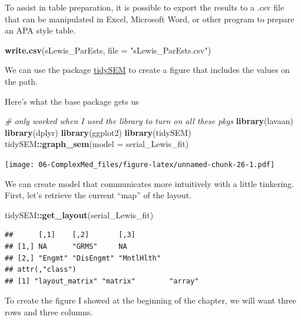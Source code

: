 \documentclass[
  11pt,
]{book}
\newenvironment{Shaded}{\begin{snugshade}}{\end{snugshade}}
\newcommand{\AttributeTok}[1]{\textcolor[rgb]{0.27,0.27,0.27}{#1}}
\newcommand{\CommentTok}[1]{\textcolor[rgb]{0.37,0.37,0.37}{\textit{#1}}}
\newcommand{\FunctionTok}[1]{\textcolor[rgb]{0.27,0.27,0.27}{\textbf{#1}}}
\newcommand{\NormalTok}[1]{#1}
\newcommand{\SpecialCharTok}[1]{\textcolor[rgb]{0.43,0.43,0.43}{\textbf{#1}}}
\newcommand{\StringTok}[1]{\textcolor[rgb]{0.5,0.5,0.5}{#1}}
\begin{document}
To assist in table preparation, it is possible to export the results to a .csv file that can be manipulated in Excel, Microsoft Word, or other program to prepare an APA style table.

\begin{Shaded}
\begin{Highlighting}[]
\FunctionTok{write.csv}\NormalTok{(sLewis\_ParEsts, }\AttributeTok{file =} \StringTok{"sLewis\_ParEsts.csv"}\NormalTok{)}
\end{Highlighting}
\end{Shaded}

We can use the package \href{https://cjvanlissa.github.io/tidySEM/articles/Plotting_graphs.html}{tidySEM} to create a figure that includes the values on the path.

Here's what the base package gets us

\begin{Shaded}
\begin{Highlighting}[]
\CommentTok{\# only worked when I used the library to turn on all these pkgs}
\FunctionTok{library}\NormalTok{(lavaan)}
\FunctionTok{library}\NormalTok{(dplyr)}
\FunctionTok{library}\NormalTok{(ggplot2)}
\FunctionTok{library}\NormalTok{(tidySEM)}
\NormalTok{tidySEM}\SpecialCharTok{::}\FunctionTok{graph\_sem}\NormalTok{(}\AttributeTok{model =}\NormalTok{ serial\_Lewis\_fit)}
\end{Highlighting}
\end{Shaded}

\texttt{[image: 06-ComplexMed\_files/figure-latex/unnamed-chunk-26-1.pdf]}

We can create model that communicates more intuitively with a little tinkering. First, let's retrieve the current ``map'' of the layout.

\begin{Shaded}
\begin{Highlighting}[]
\NormalTok{tidySEM}\SpecialCharTok{::}\FunctionTok{get\_layout}\NormalTok{(serial\_Lewis\_fit)}
\end{Highlighting}
\end{Shaded}

\begin{verbatim}
##      [,1]    [,2]       [,3]      
## [1,] NA      "GRMS"     NA        
## [2,] "Engmt" "DisEngmt" "MntlHlth"
## attr(,"class")
## [1] "layout_matrix" "matrix"        "array"
\end{verbatim}

To create the figure I showed at the beginning of the chapter, we will want three rows and three columns.
\end{document}
